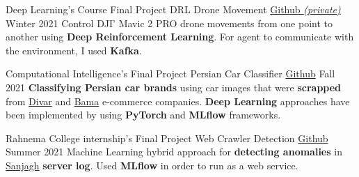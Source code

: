 
\begin{cventries}

  \cventry%
    {Deep Learning's Course Final Project} %
    {DRL Drone Movement} %
    {\href{https://github.com/zivdar001matin/drl-drone-movement}{Github {\bodyfontlight\slshape(private)}}} %
    {Winter 2021} %
    {Control DJI' Mavic 2 PRO drone movements from one point to another using {\textbf{Deep Reinforcement Learning}}. For agent to communicate with the environment, I used {\textbf{Kafka}}.}
    
  \cventry%
    {Computational Intelligence's Final Project} %
    {Persian Car Classifier} %
    {\href{https://github.com/zivdar001matin/computational-intelligence-final-project}{Github}} %
    {Fall 2021} %
    {\textbf{Classifying Persian car brands} using car images that were \textbf{scrapped} from \href{https://divar.ir/}{Divar} and \href{https://bama.ir/}{Bama} e-commerce companies.
    \textbf{Deep Learning} approaches have been implemented by using \textbf{PyTorch} and \textbf{MLflow} frameworks.}
  
  \cventry%
    {Rahnema College internship's Final Project} %
    {Web Crawler Detection} %
    {\href{https://github.com/zivdar001matin/web-crawler-detection}{Github}} %
    {Summer 2021} %
    {Machine Learning hybrid approach for {\textbf{detecting anomalies}} in \href{https://sanjagh.pro}{Sanjagh} {\textbf{server log}}. Used {\textbf{MLflow}} in order to run as a web service.}
\end{cventries}
